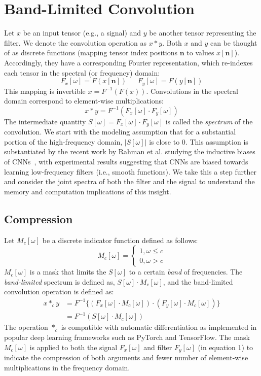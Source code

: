 \section{Band-Limited Convolution}
Let $x$ be an input tensor (e.g., a signal) and $y$ be another tensor representing the filter.
We denote the convolution operation as $x * y$.
Both $x$ and $y$ can be thought of as discrete functions (mapping tensor index positions $\mathbf{n}$ to values $x[\mathbf{n}]$). Accordingly, they have a corresponding Fourier  representation, which re-indexes each tensor in the spectral (or frequency) domain:
\[
F_x[\omega] = F(x[\mathbf{n}]) ~~~~~~~  F_y[\omega] = F(y[\mathbf{n}])
\] 
This mapping is invertible $x = F^{-1}(F(x))$. Convolutions in the spectral domain correspond to element-wise multiplications:
\[
x * y = F^{-1}(F_x[\omega] \cdot F_y[\omega])
\]
The intermediate quantity $S[\omega] = F_x[\omega] \cdot F_y[\omega]$ is called the \emph{spectrum} of the convolution. We start with the modeling assumption that for a substantial portion of the high-frequency domain, $|S[\omega]|$ is close to 0.
This assumption is substantiated by the recent work by Rahman et al. studying the inductive biases of CNNs~\cite{rahaman2018spectral}, with experimental results suggesting that CNNs are biased towards learning low-frequency filters (i.e., smooth functions). We take this a step further and consider the joint spectra of both the filter and the signal to understand the memory and computation implications of this insight.

\subsection{Compression}
Let $M_c[\omega]$ be a discrete indicator function defined as follows:
\[
M_c[\omega] = \begin{cases}
1, \omega \le c\\
0,\omega > c
\end{cases}
\]
$M_c[\omega]$ is a mask that limits the $S[\omega]$ to a certain \emph{band} of frequencies.
The \emph{band-limited} spectrum is defined as, $S[\omega] \cdot M_c[\omega]$,
and the band-limited convolution operation is defined as:
\begin{align*}
 x *_c y & = F^{-1}\{(F_x[\omega] \cdot M_c[\omega]) \cdot (F_y[\omega] \cdot M_c[\omega])\} \tag{1}\\
 & = F^{-1}(S[\omega] \cdot M_c[\omega]) \tag{2}  
\end{align*}
The operation $*_c$ is compatible with automatic differentiation as implemented in popular deep learning frameworks such as \textsf{PyTorch} and \textsf{TensorFlow}. The mask $M_c[\omega]$ is applied to both the signal $F_x[\omega]$ and filter $F_y[\omega]$ (in equation 1) to indicate the compression of both arguments and fewer number of element-wise multiplications in the frequency domain.


